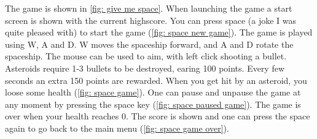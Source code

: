The game is shown in \cref{fig: give me space}. When launching the game a start screen is shown with the current highscore. You can press space (a joke I was quite pleased with) to start the game (\cref{fig: space new game}). The game is played using W, A and D. W moves the spaceship forward, and A and D rotate the spaceship. The mouse can be used to aim, with left click shooting a bullet. Asteroids require 1-3 bullets to be destroyed, earing 100 points. Every few seconds an extra 150 points are rewarded. When you get hit by an asteroid, you loose some health (\cref{fig: space game}). One can pause and unpause the game at any moment by pressing the space key (\cref{fig: space paused game}). The game is over when your health reaches 0. The score is shown and one can press the space again to go back to the main menu (\cref{fig: space game over}).

